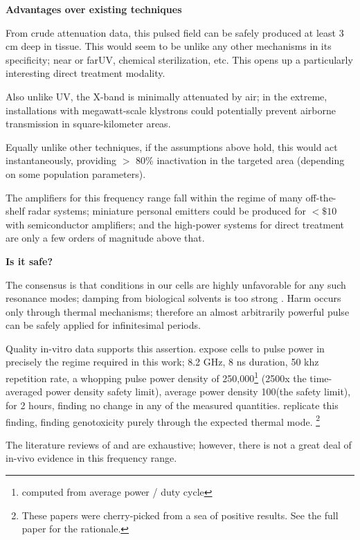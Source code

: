 \documentclass[fleqn,10pt]{paper}
\begin{document}
{\Large \textbf{Advantages over existing techniques}}

From crude attenuation data, this pulsed field can be safely produced at least 3 cm deep in tissue. This would seem to be unlike any other mechanisms in its specificity; near or far\cite{Germicidal2017}UV, chemical sterilization, etc. This opens up a particularly interesting direct treatment modality.

Also unlike UV, the X-band is minimally attenuated by air; in the extreme, installations with megawatt-scale klystrons could potentially prevent airborne transmission in square-kilometer areas.

Equally unlike other techniques, if the assumptions above hold, this would act instantaneously, providing $>$ 80\% inactivation in the targeted area (depending on some population parameters).

The amplifiers for this frequency range fall within the regime of many off-the-shelf radar systems; miniature personal emitters could be produced for $ < \$10$ with semiconductor amplifiers; and the high-power systems for direct treatment are only a few orders of magnitude above that.

{\Large \textbf{Is it safe?}}

The consensus is that conditions in our cells are highly unfavorable for any such resonance modes; damping from biological solvents is too strong \cite{Vibrational2002}. Harm occurs only through thermal mechanisms; therefore an almost arbitrarily powerful pulse can be safely applied for infinitesimal periods.

Quality in-vitro data supports this assertion. \cite{Cytogenetic2006} expose cells to pulse power in precisely the regime required in this work; 8.2 GHz, 8 ns duration, 50 khz repetition rate, a whopping pulse power density of 250,000\Wsqm\footnote{computed from average power / duty cycle} (2500x the time-averaged power density safety limit), average power density 100\Wsqm (the safety limit), for 2 hours, finding no change in any of the measured quantities. \cite{DNA2004} replicate this finding, finding genotoxicity purely through the expected thermal mode. \footnote{These papers were cherry-picked from a sea of positive results. See the full paper for the rationale.}

The literature reviews of \cite{ICNIRP2020} and \cite{C95} are exhaustive; however, there is not a great deal of in-vivo evidence in this frequency range\cite{New2019}\cite{Comprehensive2018}.
\end{document}

